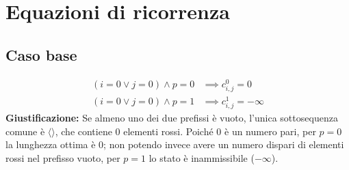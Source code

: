 \section{Equazioni di ricorrenza}

\subsection{Caso base}
\begin{align*}
    (i = 0 \lor j = 0) \land p = 0 &\implies c_{i,j}^0 = 0 \\
    (i = 0 \lor j = 0) \land p = 1 &\implies c_{i,j}^1 = -\infty
\end{align*}
\textbf{Giustificazione:} Se almeno uno dei due prefissi è vuoto, l'unica sottosequenza comune è $\langle \rangle$, che contiene $0$ elementi rossi. Poiché $0$ è un numero pari, per $p = 0$ la lunghezza ottima è $0$; non potendo invece avere un numero dispari di elementi rossi nel prefisso vuoto, per $p = 1$ lo stato è inammissibile ($-\infty$).

